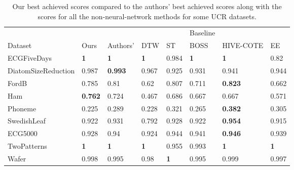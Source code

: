 \begin{table}[h!]
\caption{Our best achieved scores compared to the authors' best achieved scores along with the scores for all the non-neural-network methods for some UCR datasets.}
\label{tab:table1non}
\centering
\begin{tabular}{llllllll}
    \hline
                        &                &                & \vrule    &            &    Baseline        &          &  \\

    Dataset             & Ours           & Authors'       & \vrule   DTW        & ST         & BOSS       & HIVE-COTE      & EE         \\
    \hline
    ECGFiveDays         & \textbf{1}          & \textbf{1}     & \textbf{1}      & 0.984      & \textbf{1} & \textbf{1}     & 0.82       \\
    DiatomSizeReduction & 0.987 & \textbf{0.993} & 0.967      & 0.925      & 0.931      & 0.941          & 0.944      \\
    FordB               & 0.785          & 0.81           & 0.62       & 0.807      & 0.711      & \textbf{0.823} & 0.662      \\
    Ham                 & \textbf{0.762} & 0.724          & 0.467      & 0.686      & 0.667      & 0.667          & 0.571      \\
    Phoneme             & 0.225           & 0.289          & 0.228      & 0.321      & 0.265      & \textbf{0.382} & 0.305      \\
    SwedishLeaf         & 0.922          & 0.931          & 0.792      & 0.928      & 0.922      & \textbf{0.954} & 0.915      \\ \hdashline
    ECG5000             & 0.928          & 0.94          & 0.924      & 0.944      & 0.941      & \textbf{0.946} & 0.939      \\
    TwoPatterns         & \textbf{1}     & \textbf{1}     & \textbf{1} & 0.955      & 0.993      & \textbf{1}     & \textbf{1} \\
    Wafer               & 0.998          & 0.995          & 0.98       & \textbf{1} & 0.995      & 0.999          & 0.997      
    \end{tabular}
\end{table}

